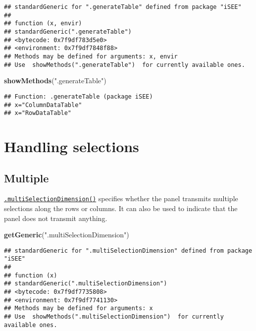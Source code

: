 \documentclass[
]{book}
\newenvironment{Shaded}{\begin{snugshade}}{\end{snugshade}}
\newcommand{\KeywordTok}[1]{\textcolor[rgb]{0.13,0.29,0.53}{\textbf{#1}}}
\newcommand{\NormalTok}[1]{#1}
\newcommand{\StringTok}[1]{\textcolor[rgb]{0.31,0.60,0.02}{#1}}
\begin{document}
\begin{verbatim}
## standardGeneric for ".generateTable" defined from package "iSEE"
## 
## function (x, envir) 
## standardGeneric(".generateTable")
## <bytecode: 0x7f9df783d5e0>
## <environment: 0x7f9df7848f88>
## Methods may be defined for arguments: x, envir
## Use  showMethods(".generateTable")  for currently available ones.
\end{verbatim}

\begin{Shaded}
\begin{Highlighting}[]
\KeywordTok{showMethods}\NormalTok{(}\StringTok{".generateTable"}\NormalTok{)}
\end{Highlighting}
\end{Shaded}

\begin{verbatim}
## Function: .generateTable (package iSEE)
## x="ColumnDataTable"
## x="RowDataTable"
\end{verbatim}

\hypertarget{handling-selections}{%
\section{Handling selections}\label{handling-selections}}

\hypertarget{multiple}{%
\subsection{Multiple}\label{multiple}}

\href{https://isee.github.io/iSEE/reference/multi-select-generics.html}{\texttt{.multiSelectionDimension()}} specifies whether the panel transmits multiple selections along the rows or columns.
It can also be used to indicate that the panel does not transmit anything.

\begin{Shaded}
\begin{Highlighting}[]
\KeywordTok{getGeneric}\NormalTok{(}\StringTok{".multiSelectionDimension"}\NormalTok{)}
\end{Highlighting}
\end{Shaded}

\begin{verbatim}
## standardGeneric for ".multiSelectionDimension" defined from package "iSEE"
## 
## function (x) 
## standardGeneric(".multiSelectionDimension")
## <bytecode: 0x7f9df7735808>
## <environment: 0x7f9df7741130>
## Methods may be defined for arguments: x
## Use  showMethods(".multiSelectionDimension")  for currently available ones.
\end{verbatim}
\end{document}
